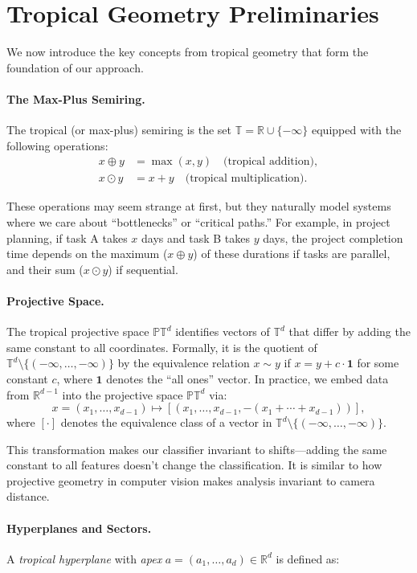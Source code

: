 \documentclass{article}
\newcommand{\R}{\mathbb{R}}
\newcommand{\trop}{\mathbb{T}}
\newcommand{\proj}{\mathbb{P}}
\begin{document}
\section{Tropical Geometry Preliminaries}\label{sec:prelim}

We now introduce the key concepts from tropical geometry that form the foundation of our approach.

\paragraph{The Max-Plus Semiring.}
The tropical (or max-plus) semiring is the set $\trop = \R \cup \{-\infty\}$
equipped with the following operations:
\begin{align}
x \oplus y &= \max(x,y) \quad \text{(tropical addition)}, \\
x \odot y &= x + y \quad \text{(tropical multiplication)}.
\end{align}

These operations may seem strange at first, but they naturally model systems where we care about ``bottlenecks'' or ``critical paths.'' For example, in project planning, if task A takes $x$ days and task B takes $y$ days, the project completion time depends on the maximum ($x \oplus y$) of these durations if tasks are parallel, and their sum ($x \odot y$) if sequential.

\paragraph{Projective Space.}  
The tropical projective space $\proj \trop^d$ identifies vectors of $\trop^d$ that differ by adding the same constant to all coordinates. Formally, it is the quotient of $\trop^d \setminus \{(-\infty,\dots,-\infty)\}$ by the equivalence relation $x \sim y$ if $x = y + c \cdot \mathbf{1}$ for some constant $c$, where $\mathbf{1}$ denotes the ``all ones'' vector. In practice, we embed data from $\R^{d-1}$ into the projective space $\proj \trop^d$ via:
\[
x=(x_1,\dots,x_{d-1})\mapsto [(x_1,\dots,x_{d-1},-(x_1+\cdots+x_{d-1}))],
\]
where $[\cdot]$ denotes the equivalence class of a vector in  $\trop^d \setminus \{(-\infty,\dots,-\infty)\}$.

This transformation makes our classifier invariant to shifts—adding the same constant to all features doesn't change the classification. It is similar to how projective geometry in computer vision makes analysis invariant to camera distance.

\paragraph{Hyperplanes and Sectors.}
A {\em tropical hyperplane} with {\em apex} $a=(a_1,\dots,a_d) \in \R^d$ is defined as:
\end{document}
